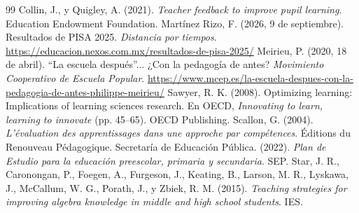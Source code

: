 \documentclass[spanish,letterpaper,oneside]{article}
\begin{document}
\clearpage
\begin{thebibliography}{99}
 Collin, J., y Quigley, A. (2021). \textit{Teacher feedback to improve pupil learning}. Education Endowment Foundation.
 Martínez Rizo, F. (2026, 9 de septiembre). Resultados de PISA 2025. \textit{Distancia por tiempos}. \url{https://educacion.nexos.com.mx/resultados-de-pisa-2025/}
 Meirieu, P. (2020, 18 de abril). ``La escuela después''... ¿Con la pedagogía de antes? \textit{Movimiento Cooperativo de Escuela Popular}. \url{https://www.mcep.es/la-escuela-despues-con-la-pedagogia-de-antes-philippe-meirieu/}
 Sawyer, R. K. (2008). Optimizing learning: Implications of learning sciences research. En OECD, \textit{Innovating to learn, learning to innovate} (pp. 45--65). OECD Publishing.
 Scallon, G. (2004). \textit{L'évaluation des apprentissages dans une approche par compétences}. Éditions du Renouveau Pédagogique.
 Secretaría de Educación Pública. (2022). \textit{Plan de Estudio para la educación preescolar, primaria y secundaria}. SEP.
 Star, J. R., Caronongan, P., Foegen, A., Furgeson, J., Keating, B., Larson, M. R., Lyskawa, J., McCallum, W. G., Porath, J., y Zbiek, R. M. (2015). \textit{Teaching strategies for improving algebra knowledge in middle and high school students}. IES.
\end{thebibliography}
\end{document}
